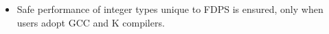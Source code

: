 \begin{itemize}
\item Safe performance of integer types unique to FDPS is ensured,
  only when users adopt GCC and K compilers.
\end{itemize}
